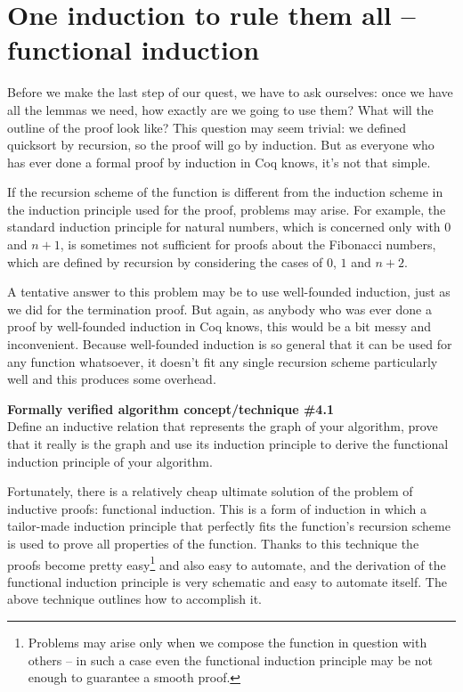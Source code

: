 \documentclass[declaration,mgr,english,shortabstract]{iithesis}
\begin{document}
\section{One induction to rule them all -- functional induction} \label{funind}

Before we make the last step of our quest, we have to ask ourselves: once we have all the lemmas we need, how exactly are we going to use them? What will the outline of the proof look like? This question may seem trivial: we defined quicksort by recursion, so the proof will go by induction. But as everyone who has ever done a formal proof by induction in Coq knows, it's not that simple.

If the recursion scheme of the function is different from the induction scheme in the induction principle used for the proof, problems may arise. For example, the standard induction principle for natural numbers, which is concerned only with $0$ and $n + 1$, is sometimes not sufficient for proofs about the Fibonacci numbers, which are defined by recursion by considering the cases of $0$, $1$ and $n + 2$.

A tentative answer to this problem may be to use well-founded induction, just as we did for the termination proof. But again, as anybody who was ever done a proof by well-founded induction in Coq knows, this would be a bit messy and inconvenient. Because well-founded induction is so general that it can be used for any function whatsoever, it doesn't fit any single recursion scheme particularly well and this produces some overhead.

\begin{center}
    \textbf{Formally verified algorithm concept/technique \#4.1} \\
    Define an inductive relation that represents the graph of your algorithm, prove that it really is the graph and use its induction principle to derive the functional induction principle of your algorithm.
\end{center}

Fortunately, there is a relatively cheap ultimate solution of the problem of inductive proofs: functional induction. This is a form of induction in which a tailor-made induction principle that perfectly fits the function's recursion scheme is used to prove all properties of the function. Thanks to this technique the proofs become pretty easy\footnote{Problems may arise only when we compose the function in question with others -- in such a case even the functional induction principle may be not enough to guarantee a smooth proof.} and also easy to automate, and the derivation of the functional induction principle is very schematic and easy to automate itself. The above technique outlines how to accomplish it.
\end{document}
